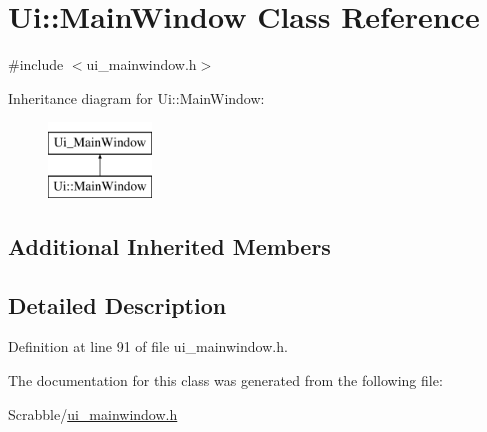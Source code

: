 \hypertarget{class_ui_1_1_main_window}{\section{Ui\-:\-:Main\-Window Class Reference}
\label{class_ui_1_1_main_window}
}


{\ttfamily \#include $<$ui\-\_\-mainwindow.\-h$>$}

Inheritance diagram for Ui\-:\-:Main\-Window\-:\begin{figure}[H]
\begin{center}
\leavevmode
\includegraphics[height=2.000000cm]{class_ui_1_1_main_window}
\end{center}
\end{figure}
\subsection*{Additional Inherited Members}


\subsection{Detailed Description}


Definition at line 91 of file ui\-\_\-mainwindow.\-h.



The documentation for this class was generated from the following file\-:\begin{DoxyCompactItemize}
\item 
Scrabble/\hyperlink{ui__mainwindow_8h}{ui\-\_\-mainwindow.\-h}\end{DoxyCompactItemize}
